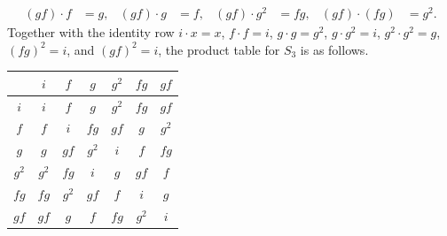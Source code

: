 \begin{enumerate}
\begin{enumerate}
\begin{subprove}
\begin{align*}
        (g f) \cdot f &= g, & (g f) \cdot g &= f, & (g f) \cdot g^{2} &= f g, & (g f) \cdot (f g) &= g^{2}.
      \end{align*}
      Together with the identity row \(i \cdot x = x\), \(f \cdot f = i\), \(g \cdot g = g^{2}\), \(g \cdot g^{2} = i\), \(g^{2} \cdot g^{2} = g\), \((f g)^{2} = i\), and \((g f)^{2} = i\), the product table for \(S_{3}\) is as follows.
      \begin{center}
      \begin{tabular}{|c|c|c|c|c|c|c|}
      \hline
      & \(i\) & \(f\) & \(g\) & \(g^{2}\) & \(f g\) & \(g f\) \\
      \hline
      \(i\) & \(i\) & \(f\) & \(g\) & \(g^{2}\) & \(f g\) & \(g f\) \\
      \hline
      \(f\) & \(f\) & \(i\) & \(f g\) & \(g f\) & \(g\) & \(g^{2}\) \\
      \hline
      \(g\) & \(g\) & \(g f\) & \(g^{2}\) & \(i\) & \(f\) & \(f g\) \\
      \hline
      \(g^{2}\) & \(g^{2}\) & \(f g\) & \(i\) & \(g\) & \(g f\) & \(f\) \\
      \hline
      \(f g\) & \(f g\) & \(g^{2}\) & \(g f\) & \(f\) & \(i\) & \(g\) \\
      \hline
      \(g f\) & \(g f\) & \(g\) & \(f\) & \(f g\) & \(g^{2}\) & \(i\) \\
      \hline
      \end{tabular}
      \end{center}
    \end{subprove}
  \end{enumerate}




\end{enumerate}
